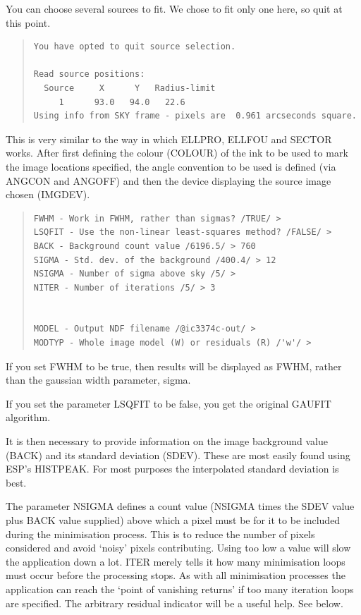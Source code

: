 \documentclass[twoside,11pt]{article}
\newenvironment{myquote}{\begin{quote}\begin{small}}{\end{small}\end{quote}}
\begin{document}
You can choose several sources to fit.  We chose to fit only one here,
so quit at this point.

\begin{myquote}
\begin{verbatim}
You have opted to quit source selection.

Read source positions:
  Source     X      Y   Radius-limit
     1      93.0   94.0   22.6
Using info from SKY frame - pixels are  0.961 arcseconds square.
\end{verbatim}
\end{myquote}

This is very similar to the way in which ELLPRO, ELLFOU and SECTOR works. 
After first defining the colour (COLOUR) of the ink to be used to mark the 
image locations specified, the angle convention to be used is 
defined (via ANGCON and ANGOFF) and then the device displaying the 
source image chosen (IMGDEV).


\begin{myquote}
\begin{verbatim}
FWHM - Work in FWHM, rather than sigmas? /TRUE/ > 
LSQFIT - Use the non-linear least-squares method? /FALSE/ > 
BACK - Background count value /6196.5/ > 760
SIGMA - Std. dev. of the background /400.4/ > 12
NSIGMA - Number of sigma above sky /5/ > 
NITER - Number of iterations /5/ > 3


MODEL - Output NDF filename /@ic3374c-out/ > 
MODTYP - Whole image model (W) or residuals (R) /'w'/ > 
\end{verbatim}
\end{myquote}
If you set FWHM to be
true, then results will be displayed as FWHM, rather than the gaussian
width parameter, sigma.


If you set the parameter LSQFIT to be false, you get the original
GAUFIT algorithm.

It is then necessary to provide information on the image background value
(BACK) and its standard deviation (SDEV). These are most easily found 
using ESP's HISTPEAK. For most purposes the interpolated standard deviation is
best.

The parameter NSIGMA defines a count value (NSIGMA times the SDEV value 
plus BACK value supplied)
above which a pixel must be
for it to be included during the minimisation process. This is to reduce
the number of pixels considered and avoid `noisy' pixels contributing. 
Using too low a value will slow the application down a lot. 
ITER merely tells it how many minimisation loops must occur before the 
processing stops. As with all minimisation processes the application can 
reach the `point of vanishing returns' if too many iteration loops are 
specified. The arbitrary residual indicator will be a useful help. See below.
\end{document}
